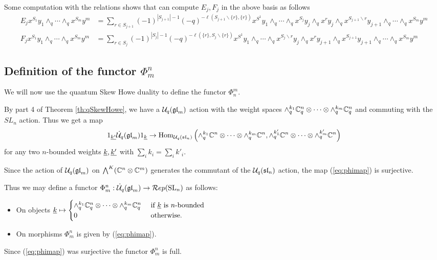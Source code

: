 \documentclass[10pt,leqno]{article}
\begin{document}
Some computation with the relations shows that can compute $ E_j, F_j $ in the above basis as follows
\begin{align} \label{eq:Eaction}
E_j x^{S_1} y_1 \wedge_q \cdots \wedge_q x^{S_m}y^m  &= \sum_{r \in S_{j+1}} (-1)^{|S_{j+1}| - 1} (-q)^{-\ell(S_{j+1}\smallsetminus \{r\}, \{r\})} x^{S^1} y_1 \wedge_q \cdots \wedge_q x^{S_j} y_j \wedge_q x^r y_j \wedge_q x^{S_{j+1} \smallsetminus r} y_{j+1} \wedge_q \cdots \wedge_q x^{S_m} y^m \\
\label{eq:Faction}
F_j x^{S_1} y_1 \wedge_q \cdots \wedge_q x^{S_m}y^m  &= \sum_{r \in S_j} (-1)^{|S_j| -1} (-q)^{-\ell(\{r\}, S_{j}\smallsetminus \{r\})} x^{S^1} y_1 \wedge_q \cdots \wedge_q x^{S_j \smallsetminus r} y_j \wedge_q x^r y_{j+1} \wedge_q x^{S_{j+1}} y_{j+1} \wedge_q \cdots \wedge_q x^{S_m} y^m
\end{align}

\subsection{Definition of the functor $\Phi_m^n$}

We will now use the quantum Skew Howe duality to define the functor $ \Phi_n^m$.

By part 4 of Theorem \ref{th:qSkewHowe}, we have a $\mathcal{U}_q({\mathfrak{gl}}_m)$ action with the weight spaces $\wedge^{k_1}_q \mathbb C_q^n \otimes \cdots \otimes \wedge^{k_m}_q \mathbb C_q^n$ and commuting with the $SL_n $ action.  Thus we get a map
\begin{equation}\label{eq:phimap}
1_{\underline{k'}} \dot{{\mathcal{U}}}_q({\mathfrak{gl}}_m) 1_{\underline{k}} \rightarrow \operatorname{Hom}_{\mathcal{U}_q({\mathfrak{sl}}_n)} \left(\wedge^{k_1}_q \mathbb C^n \otimes \cdots \otimes \wedge^{k_m}_q \mathbb C^n, \wedge^{k'_1}_q \mathbb C^n \otimes \cdots \otimes \wedge^{k'_m}_q \mathbb C^n\right)
\end{equation}
for any two $n$-bounded weights ${\underline{k}}, {\underline{k'}}$ with $\sum_i k_i = \sum_i k'_i $.

Since the action of $\mathcal{U}_q({\mathfrak{gl}}_m)$  on $\bigwedge^K(\mathbb C^n \otimes \mathbb C^m) $ generates the commutant of the $\mathcal{U}_q({\mathfrak{sl}}_n)$ action, the map (\ref{eq:phimap}) is surjective.

Thus we may define a functor $\Phi_m^n : \dot{{\mathcal{U}}}_q({\mathfrak{gl}}_m) \rightarrow \mathcal{R}ep({\rm{SL}}_n)$ as follows:
\begin{itemize}
\item On objects
${\underline{k}} \mapsto
\begin{cases}
\wedge^{k_1}_q \mathbb C_q^n \otimes \cdots \otimes \wedge^{k_m}_q \mathbb C_q^n & \text{ if } {\underline{k}} \text{ is } n\text{-bounded } \\
0 & \text{ otherwise.}
\end{cases}$
\item On morphisms $ \Phi_m^n $ is given by (\ref{eq:phimap}).
\end{itemize}
Since (\ref{eq:phimap}) was surjective the functor $\Phi_m^n$ is full.
\end{document}

